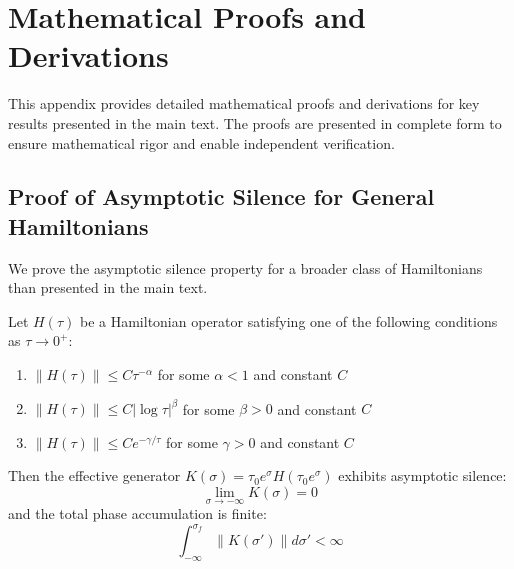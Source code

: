 \section{Mathematical Proofs and Derivations}
\label{app:mathematical_proofs}

This appendix provides detailed mathematical proofs and derivations for key results presented in the main text. The proofs are presented in complete form to ensure mathematical rigor and enable independent verification.

\subsection{Proof of Asymptotic Silence for General Hamiltonians}
\label{app:asymptotic_silence_general}

We prove the asymptotic silence property for a broader class of Hamiltonians than presented in the main text.

\begin{theorem}
Let $H(\tau)$ be a Hamiltonian operator satisfying one of the following conditions as $\tau \to 0^+$:
\begin{enumerate}
\item $\|H(\tau)\| \leq C \tau^{-\alpha}$ for some $\alpha < 1$ and constant $C$
\item $\|H(\tau)\| \leq C |\log \tau|^{\beta}$ for some $\beta > 0$ and constant $C$
\item $\|H(\tau)\| \leq C e^{-\gamma/\tau}$ for some $\gamma > 0$ and constant $C$
\end{enumerate}
Then the effective generator $K(\sigma) = \tau_0 e^\sigma H(\tau_0 e^\sigma)$ exhibits asymptotic silence:
\begin{equation}
\lim_{\sigma \to -\infty} K(\sigma) = 0
\end{equation}
and the total phase accumulation is finite:
\begin{equation}
\int_{-\infty}^{\sigma_f} \|K(\sigma')\| d\sigma' < \infty
\end{equation}
\end{theorem}

